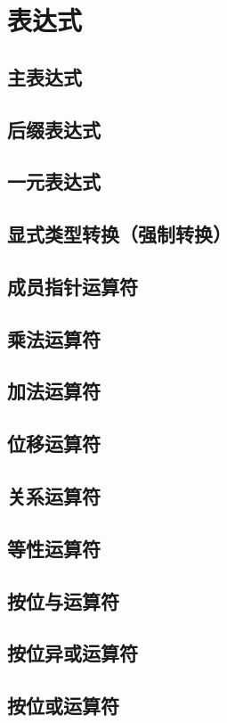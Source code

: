 
\chapter{表达式}

\section{主表达式}
\section{后缀表达式}
\section{一元表达式}
\section{显式类型转换（强制转换）}
\section{成员指针运算符}
\section{乘法运算符}
\section{加法运算符}
\section{位移运算符}
\section{关系运算符}
\section{等性运算符}
\section{按位与运算符}
\section{按位异或运算符}
\section{按位或运算符}
